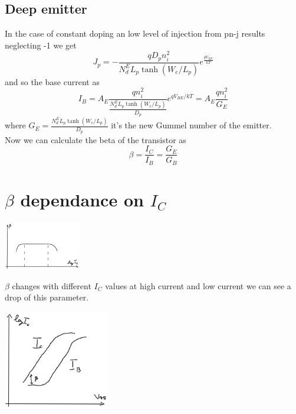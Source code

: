 \subsection{Deep emitter}
In the case of constant doping an low level of injection from pn-j results neglecting -1 we get
\begin{equation}
J_p=-{\frac{qD_pn_i^2}{N_d^EL_p\tanh(W_e/L_p)}e^{\frac{qV_{BE}}{kT}}}
\end{equation}
and so the base current as
\begin{equation}
I_B=A_E \frac{qn_i^2}{\frac{N_d^E L_p \tanh(W_e/L_p)}{D_p}}e^{qV_{BE}/kT}=A_E \frac{qn_i^2}{G_E}
\end{equation}
where $G_E=\frac{N_d^EL_p \tanh(W_e/L_p)}{D_p}$ it's the new Gummel number of the emitter. \\
Now we can calculate the beta of the transistor as
\begin{equation}
\beta=\frac{I_C}{I_B}=\frac{G_E}{G_B}
\end{equation}

\section{$\beta$ dependance on $I_C$}

\centering
\includegraphics[width=0.25\textwidth]{bjt7.png}\\
\raggedright

$\beta$ changes with different $I_C$ values at high current and low current we can see a drop of this parameter.

\centering
\includegraphics[width=0.35\textwidth]{bjt8.png}\\
\raggedright


